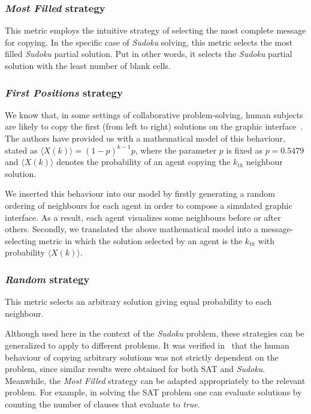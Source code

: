 \documentclass{article}
\begin{document}
\subsubsection{{\em Most Filled} strategy}

This metric employs the intuitive strategy of selecting the most complete message for copying. In the specific case of {\em Sudoku} solving, this metric selects the most filled {\em Sudoku} partial solution. Put in other words, it selects the {\em Sudoku} partial solution with the least number of blank cells.


\subsubsection{{\em First Positions} strategy}

We know that, in some settings of collaborative problem-solving, human subjects are likely to copy the first (from left to right) solutions on the graphic interface~\cite{farenzena:collabem}. The authors have provided us with a mathematical model of this behaviour, stated as $\langle X(k)\rangle = (1-p)^{k-1}p$, where the parameter $p$ is fixed as $p = 0.5479$ and $\langle X(k)\rangle$ denotes the probability of an agent copying the $k_{th}$ neighbour solution.

We inserted this behaviour into our model by firstly generating a random ordering of neighbours for each agent in order to compose a simulated graphic interface. As a result, each agent visualizes some neighbours before or after others. Secondly, we translated the above mathematical model into a message-selecting metric in which the solution selected by an agent is the $k_{th}$ with probability $\langle X(k)\rangle$.

\subsubsection{{\em Random} strategy}

This metric selects an arbitrary solution giving equal probability to each neighbour.

Although used here in the context of the \emph{Sudoku} problem, these strategies can be generalized to apply to different problems. It was verified in~\cite{farenzena:collabem} that the human behaviour of copying arbitrary solutions was not strictly dependent on the problem, since similar results were obtained for both SAT and \emph{Sudoku}. Meanwhile, the \emph{Most Filled} strategy can be adapted appropriately to the relevant problem. For example, in solving the SAT problem one can evaluate solutions by counting the number of clauses that evaluate to \emph{true}.
\end{document}
